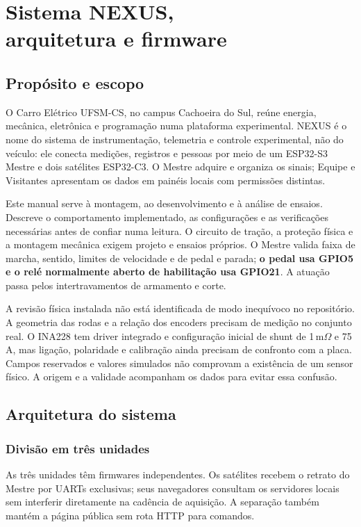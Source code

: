 \chapter[Sistema NEXUS, arquitetura e firmware]{Sistema NEXUS,\\arquitetura e firmware}
\section{Propósito e escopo}
O Carro Elétrico UFSM-CS, no campus Cachoeira do Sul, reúne energia, mecânica, eletrônica e programação numa plataforma experimental. NEXUS é o nome do sistema de instrumentação, telemetria e controle experimental, não do veículo: ele conecta medições, registros e pessoas por meio de um ESP32-S3 Mestre e dois satélites ESP32-C3. O Mestre adquire e organiza os sinais; Equipe e Visitantes apresentam os dados em painéis locais com permissões distintas.

Este manual serve à montagem, ao desenvolvimento e à análise de ensaios. Descreve o comportamento implementado, as configurações e as verificações necessárias antes de confiar numa leitura. O circuito de tração, a proteção física e a montagem mecânica exigem projeto e ensaios próprios. O Mestre valida faixa de marcha, sentido, limites de velocidade e de pedal e parada; \textbf{o pedal usa GPIO5 e o relé normalmente aberto de habilitação usa GPIO21}. A atuação passa pelos intertravamentos de armamento e corte.

A revisão física instalada não está identificada de modo inequívoco no repositório. A geometria das rodas e a relação dos encoders precisam de medição no conjunto real. O INA228 tem driver integrado e configuração inicial de shunt de 1\,m$\Omega$ e 75\,A, mas ligação, polaridade e calibração ainda precisam de confronto com a placa. Campos reservados e valores simulados não comprovam a existência de um sensor físico. A origem e a validade acompanham os dados para evitar essa confusão.

\section{Arquitetura do sistema}\label{sec:arquitetura}
\subsection{Divisão em três unidades}
As três unidades têm firmwares independentes. Os satélites recebem o retrato do Mestre por UARTs exclusivas; seus navegadores consultam os servidores locais sem interferir diretamente na cadência de aquisição. A separação também mantém a página pública sem rota HTTP para comandos.

